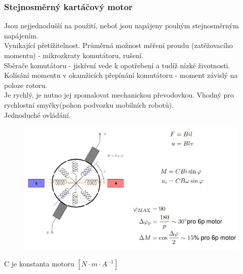 \subsubsection{Stejnosměrný kartáčový motor}
Jsou nejjednodušší na použití, neboť jsou napájeny pouhým stejnosměrným napájením.\\
Vynikající přetížitelnost. Průměrná možnost měření proudu (zatěžovacího momentu) - mikrozkraty komutátoru, rušení.\\
Sběrače komutátoru - jiskření vede k opotřebení a tudíž nízké životnosti.\\
Kolísání momentu v okamžicích přepínání komutátoru - moment závislý
na poloze rotoru.\\
Je rychlý, je nutno jej zpomalovat mechanickou převodovkou. Vhodný pro rychlostní smyčky(pohon podvozku mobilních robotů).\\
Jednoduché ovládání. \\
\begin{figure}
    \centering
    \includegraphics[scale = 0.3]{img/DCMot.png}
\end{figure}
C je konstanta motoru \([N \cdot m \cdot A^{-1}]\)\\

